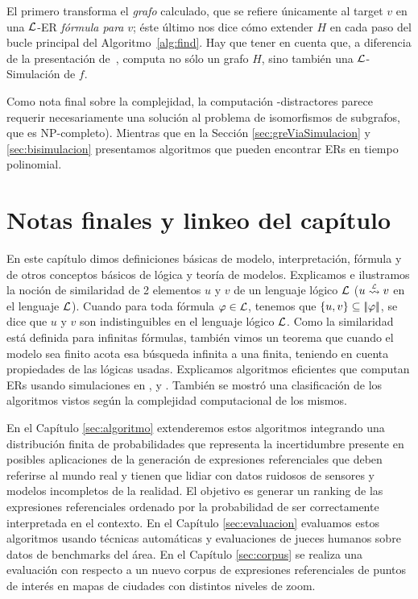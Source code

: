 El primero transforma el {\em grafo} calculado, que se refiere \'unicamente al target $v$ en una $\mathcal{L}$-ER {\em
f\'ormula para} $v$; \'este \'ultimo nos dice c\'omo extender $H$ en cada paso
del bucle principal del Algoritmo~\ref{alg:find}. Hay que tener en cuenta que, a diferencia de la
presentaci\'on de~\cite{graph},  computa
no s\'olo un grafo $H$, sino tambi\'en una $\mathcal{L}$-Simulaci\'on de $f$.

Como nota final sobre la complejidad, la computaci\'on
\EPFOL-distractores parece requerir necesariamente una soluci\'on al problema de isomorfismos de subgrafos, que es NP-completo). Mientras que en la Secci\'on \ref{sec:greViaSimulacion} y \ref{sec:bisimulacion} presentamos algoritmos que pueden encontrar ERs en tiempo polinomial.


\section{Notas finales y linkeo del cap\'itulo}
\label{sec:notasFinales}

En este cap\'itulo dimos definiciones b\'asicas de modelo, interpretaci\'on, f\'ormula y de otros conceptos b\'asicos de l\'ogica y teor\'ia de modelos. Explicamos e ilustramos la noci\'on de similaridad de 2 elementos $u$ y $v$ de un lenguaje l\'ogico $\mathcal{L}$ ($u \simil{\+L} v$ en el lenguaje $\mathcal{L}$). Cuando para toda f\'ormula $\varphi \in \mathcal{L}$, tenemos que $\{u,v\} \subseteq |\!|\varphi|\!|$,  se dice que $u$ y $v$ son indistinguibles en el lenguaje l\'ogico $\mathcal{L}$. Como la similaridad est\'a definida para infinitas f\'ormulas, tambi\'en vimos un teorema que cuando el modelo sea finito acota esa b\'usqueda
infinita a una finita, teniendo en cuenta propiedades de las l\'ogicas usadas. Explicamos algoritmos eficientes que computan ERs usando simulaciones en \FOL, \ALC y \EL. Tambi\'en se mostr\'o una clasificaci\'on de los algoritmos vistos seg\'un la complejidad computacional de los mismos. 

En el Cap\'itulo \ref{sec:algoritmo} extenderemos estos algoritmos integrando una distribuci\'on finita de probabilidades que representa la incertidumbre presente en posibles aplicaciones de la generaci\'on de expresiones referenciales que deben referirse al mundo real y tienen que lidiar con datos ruidosos de sensores y modelos incompletos de la realidad. El objetivo es generar un ranking de las expresiones referenciales ordenado por la probabilidad de ser correctamente interpretada en el contexto. En el Cap\'itulo \ref{sec:evaluacion} evaluamos estos algoritmos usando t\'ecnicas autom\'aticas y evaluaciones de jueces humanos sobre datos de benchmarks del \'area. En el Cap\'itulo \ref{sec:corpus} se realiza una evaluaci\'on con respecto a un nuevo corpus de expresiones referenciales de puntos de inter\'es en mapas de ciudades con distintos niveles de zoom. 



